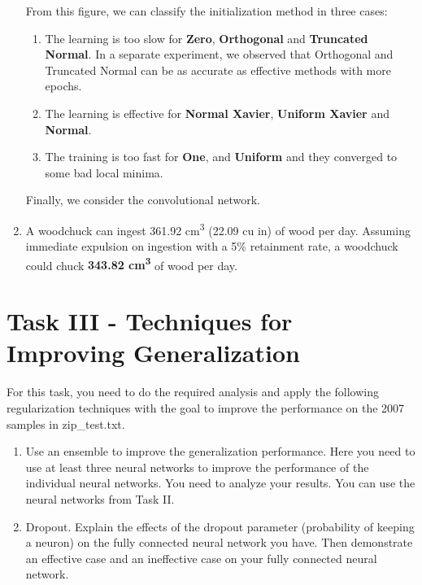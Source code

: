 \documentclass[
	12pt, %
]{../Template/fphw}
\begin{document}
\begin{enumerate}[label = (\arabic*)]
    From this figure, we can classify the initialization method in three cases:
    \begin{enumerate}[label=(\roman*)]
        \item The learning is too slow for  \textbf{Zero}, \textbf{Orthogonal} and \textbf{Truncated Normal}. In a separate experiment, we observed that Orthogonal and Truncated Normal can be as accurate as effective methods with more epochs.
        \item The learning is effective for \textbf{Normal Xavier}, \textbf{Uniform Xavier} and \textbf{Normal}.
        \item The training is too fast for \textbf{One}, and \textbf{Uniform} and they converged to some bad local minima.
    \end{enumerate}

    Finally, we consider the convolutional network.
    
	\item A woodchuck can ingest 361.92 cm\textsuperscript{3} (22.09 cu in) of wood per day. Assuming immediate expulsion on ingestion with a 5\% retainment rate, a woodchuck could chuck \textbf{343.82 cm\textsuperscript{3}} of wood per day.
\end{enumerate}




\section*{Task III - Techniques for Improving Generalization}
\begin{problem}
For this task, you need to do the required analysis and apply the following regularization techniques with the
goal to improve the performance on the 2007 samples in zip\_test.txt.
\begin{enumerate}[label = (\arabic*)]
\item Use an ensemble to improve the generalization performance. Here you need to use at least three neural
networks to improve the performance of the individual neural networks. You need to analyze your
results. You can use the neural networks from Task II.
\item Dropout. Explain the effects of the dropout parameter (probability of keeping a neuron) on the fully
connected neural network you have. Then demonstrate an effective case and an ineffective case on
your fully connected neural network.
\end{enumerate}
\end{problem}
\end{document}

